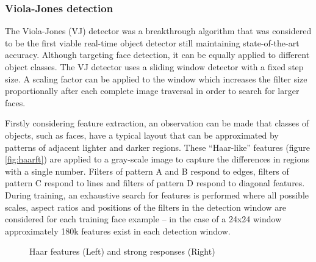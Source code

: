 \documentclass[a4paper,twoside,12pt]{report}
\begin{document}
\subsubsection{Viola-Jones detection}

The Viola-Jones (VJ) detector \citep{vjdet} was a breakthrough algorithm that was considered to be the first viable real-time object detector still maintaining state-of-the-art accuracy. Although targeting face detection, it can be equally applied to different object classes. The VJ detector uses a sliding window detector with a fixed step size. A scaling factor can be applied to the window which increases the filter size proportionally after each complete image traversal in order to search for larger faces. 

Firstly considering feature extraction, an observation can be made that classes of objects, such as faces, have a typical layout that can be approximated by patterns of adjacent lighter and darker regions. These ``Haar-like'' features (figure \ref{fig:haarft}) are applied to a gray-scale image to capture the differences in regions with a single number. Filters of pattern A and B respond to edges, filters of pattern C respond to lines and filters of pattern D respond to diagonal features. During training, an exhaustive search for features is performed where all possible scales, aspect ratios and positions of the filters in the detection window are considered for each training face example -- in the case of a 24x24 window approximately 180k features exist in each detection window. 

\begin{figure}[h!]
    \centering
    \qquad
    \caption{Haar features \citep{vjdet} (Left) and strong responses (Right)}
\end{figure}
\end{document}
